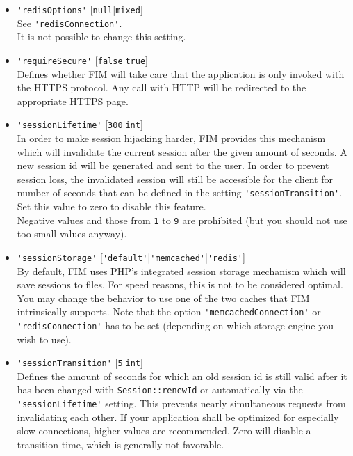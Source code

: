 \documentclass{scrartcl}
\begin{document}
\begin{itemize}
            \item \lstinline!'redisOptions'! [\lstinline!null!|\lstinline!mixed!] \\
               See \lstinline!'redisConnection'!. \\
               It is not possible to change this setting.
            \item \lstinline!'requireSecure'! [\lstinline!false!|\lstinline!true!] \\
               Defines whether FIM will take care that the application is only invoked with the HTTPS protocol. Any call with HTTP will be redirected to the appropriate HTTPS page.
            \item \lstinline!'sessionLifetime'! [\lstinline!300!|\lstinline!int!] \\
               In order to make session hijacking harder, FIM provides this mechanism which will invalidate the current session after the given amount of seconds. A new session id will be generated and sent to the user. In order to prevent session loss, the invalidated session will still be accessible for the client for number of seconds that can be defined in the setting \lstinline!'sessionTransition'!. \\
               Set this value to zero to disable this feature. \\
               Negative values and those from \lstinline!1! to \lstinline!9! are prohibited (but you should not use too small values anyway).
            \item \lstinline!'sessionStorage'! [\lstinline!'default'!|\lstinline!'memcached'!|\lstinline!'redis'!] \\
               By default, FIM uses PHP's integrated session storage mechanism which will save sessions to files. For speed reasons, this is not to be considered optimal. You may change the behavior to use one of the two caches that FIM intrinsically supports. Note that the option \lstinline!'memcachedConnection'! or \lstinline!'redisConnection'! has to be set (depending on which storage engine you wish to use).
            \item \lstinline!'sessionTransition'! [\lstinline!5!|\lstinline!int!] \\
               Defines the amount of seconds for which an old session id is still valid after it has been changed with \lstinline!Session::renewId! or automatically via the \lstinline!'sessionLifetime'! setting. This prevents nearly simultaneous requests from invalidating each other. If your application shall be optimized for especially slow connections, higher values are recommended. Zero will disable a transition time, which is generally not favorable. \\

\end{itemize}
\end{document}
